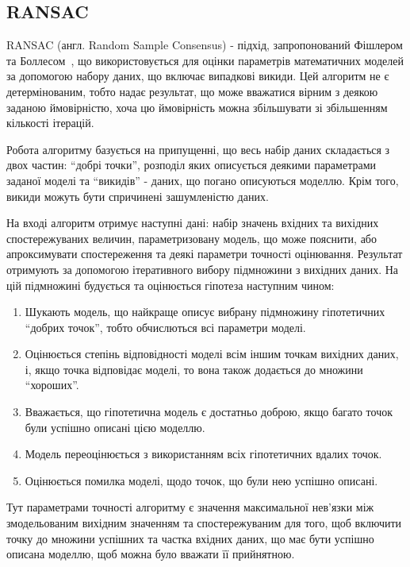\subsection{RANSAC}
\label{sec:ransac}

RANSAC (англ. Random Sample Consensus) - підхід, запропонований Фішлером та Боллесом~\cite{Fischler:1981:RSC:358669.358692}, що використовується для оцінки параметрів математичних моделей за допомогою набору даних, що включає випадкові викиди. Цей алгоритм не є детермінованим, тобто надає результат, що може вважатися вірним з деякою заданою ймовірністю, хоча цю ймовірність можна збільшувати зі збільшенням кількості ітерацій. 

Робота алгоритму базується на припущенні, що весь набір даних складається з двох частин: ``добрі точки'', розподіл яких описується деякими параметрами заданої моделі та ``викидів'' - даних, що погано описуються моделлю. Крім того, викиди можуть бути спричинені зашумленістю даних. 

На вході алгоритм отримує наступні дані: набір значень вхідних та вихідних спостережуваних величин, параметризовану модель, що може пояснити, або апроксимувати спостереження та деякі параметри точності оцінювання. Результат отримують за допомогою ітеративного вибору підмножини з вихідних даних. На цій підмножині будується та оцінюється гіпотеза наступним чином:

\begin{enumerate}
    \item Шукають модель, що найкраще описує вибрану підмножину гіпотетичних ``добрих точок'', тобто обчислються всі параметри моделі.
    \item Оцінюється степінь відповідності моделі всім іншим точкам вихідних даних, і, якщо точка відповідає моделі, то вона також додається до множини ``хороших''.
    \item Вважається, що гіпотетична модель є достатньо доброю, якщо багато точок були успішно описані цією моделлю. 
    \item Модель переоцінюється з використанням всіх гіпотетичних вдалих точок.
    \item Оцінюється помилка моделі, щодо точок, що були нею успішно описані. 
\end{enumerate}

Тут параметрами точності алгоритму є значення максимальної нев'язки між змодельованим вихідним значенням та спостережуваним для того, щоб включити точку до множини успішних та частка вхідних даних, що має бути успішно описана моделлю, щоб можна було вважати її прийнятною.

